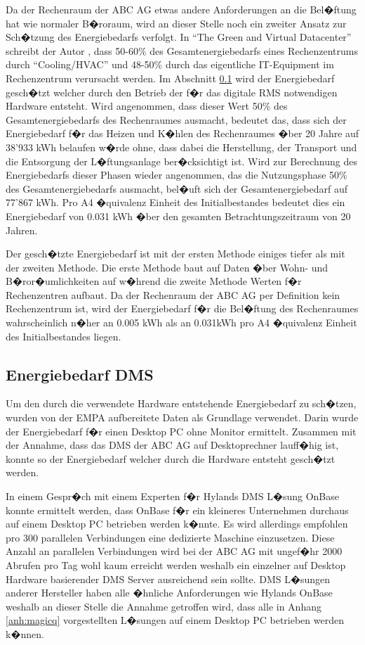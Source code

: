 \documentclass[a4paper,twoside,10pt]{report}
\begin{document}
Da der Rechenraum der ABC AG etwas andere Anforderungen an die Bel�ftung hat wie normaler B�roraum, wird an dieser Stelle noch ein zweiter Ansatz zur Sch�tzung des Energiebedarfs verfolgt. In "`The Green and Virtual Datacenter"' schreibt der Autor \citeauthor{greendc}, dass 50-60\% des Gesamtenergiebedarfs eines Rechenzentrums durch "`Cooling/HVAC"' und 48-50\% durch das eigentliche IT-Equipment im Rechenzentrum verursacht werden. Im Abschnitt \ref{energ:Hardware} wird der Energiebedarf gesch�tzt welcher durch den Betrieb der f�r das digitale \ac{RMS} notwendigen Hardware entsteht. Wird angenommen, dass dieser Wert 50\% des Gesamtenergiebedarfs des Rechenraumes ausmacht, bedeutet das, dass sich der Energiebedarf f�r das Heizen und K�hlen des Rechenraumes �ber 20 Jahre auf 38'933 kWh belaufen w�rde ohne, dass dabei die Herstellung, der Transport und die Entsorgung der L�ftungsanlage ber�cksichtigt ist. Wird zur Berechnung des Energiebedarfs dieser Phasen wieder angenommen, das die Nutzungsphase 50\% des Gesamtenergiebedarfs ausmacht, bel�uft sich der Gesamtenergiebedarf auf 77'867 kWh. Pro A4 �quivalenz Einheit des Initialbestandes bedeutet dies ein Energiebedarf von 0.031 kWh �ber den gesamten Betrachtungszeitraum von 20 Jahren. \cite{greendc}

Der gesch�tzte Energiebedarf ist mit der ersten Methode einiges tiefer als mit der zweiten Methode. Die erste Methode baut auf Daten �ber Wohn- und B�ror�umlichkeiten auf w�hrend die zweite Methode Werten f�r Rechenzentren aufbaut. Da der Rechenraum der ABC AG per Definition kein Rechenzentrum ist, wird der Energiebedarf f�r die Bel�ftung des Rechenraumes wahrscheinlich n�her an 0.005 kWh als an 0.031kWh pro A4 �quivalenz Einheit des Initialbestandes liegen.

\subsection{Energiebedarf DMS}\label{energ:Hardware}
Um den durch die verwendete Hardware entstehende Energiebedarf zu sch�tzen, wurden von der \ac{EMPA} aufbereitete Daten als Grundlage verwendet. Darin wurde der Energiebedarf f�r einen Desktop PC ohne Monitor ermittelt. Zusammen mit der Annahme, dass das \ac{DMS} der ABC AG auf Desktoprechner lauff�hig ist, konnte so der Energiebedarf welcher durch die Hardware entsteht gesch�tzt werden.  

In einem Gespr�ch mit einem Experten f�r Hylands DMS L�sung OnBase konnte ermittelt werden, dass OnBase f�r ein kleineres Unternehmen durchaus auf einem Desktop PC betrieben werden k�nnte. Es wird allerdings empfohlen pro 300 parallelen Verbindungen eine dedizierte Maschine einzusetzen. Diese Anzahl an parallelen Verbindungen wird bei der ABC AG mit ungef�hr 2000 Abrufen pro Tag wohl kaum erreicht werden weshalb ein einzelner auf Desktop Hardware basierender \ac{DMS} Server ausreichend sein sollte. DMS L�sungen anderer Hersteller haben alle �hnliche Anforderungen wie Hylands OnBase weshalb an dieser Stelle die Annahme getroffen wird, dass alle in Anhang \ref{anh:magicq} vorgestellten L�sungen auf einem Desktop PC betrieben werden k�nnen. \cite{bruno}
\end{document}
